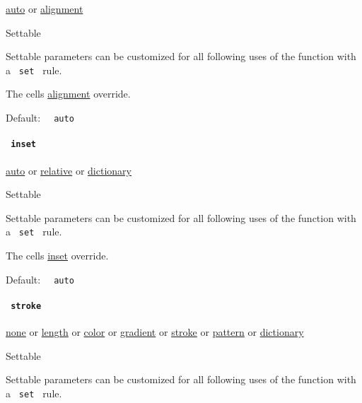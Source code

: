 \href{/docs/reference/foundations/auto/}{auto} {or}
\href{/docs/reference/layout/alignment/}{alignment}

{{ Settable }}

\label{definitions-cell-align-settable-tooltip}
Settable parameters can be customized for all following uses of the
function with a \texttt{\ set\ } rule.

The cell\textquotesingle s
\href{/docs/reference/model/table/\#parameters-align}{alignment}
override.

Default: \texttt{\ }{\texttt{\ auto\ }}\texttt{\ }

\paragraph{\texorpdfstring{\texttt{\ inset\ }}{ inset }}\label{definitions-cell-inset}

\href{/docs/reference/foundations/auto/}{auto} {or}
\href{/docs/reference/layout/relative/}{relative} {or}
\href{/docs/reference/foundations/dictionary/}{dictionary}

{{ Settable }}

\label{definitions-cell-inset-settable-tooltip}
Settable parameters can be customized for all following uses of the
function with a \texttt{\ set\ } rule.

The cell\textquotesingle s
\href{/docs/reference/model/table/\#parameters-inset}{inset} override.

Default: \texttt{\ }{\texttt{\ auto\ }}\texttt{\ }

\paragraph{\texorpdfstring{\texttt{\ stroke\ }}{ stroke }}\label{definitions-cell-stroke}

\href{/docs/reference/foundations/none/}{none} {or}
\href{/docs/reference/layout/length/}{length} {or}
\href{/docs/reference/visualize/color/}{color} {or}
\href{/docs/reference/visualize/gradient/}{gradient} {or}
\href{/docs/reference/visualize/stroke/}{stroke} {or}
\href{/docs/reference/visualize/pattern/}{pattern} {or}
\href{/docs/reference/foundations/dictionary/}{dictionary}

{{ Settable }}

\label{definitions-cell-stroke-settable-tooltip}
Settable parameters can be customized for all following uses of the
function with a \texttt{\ set\ } rule.

